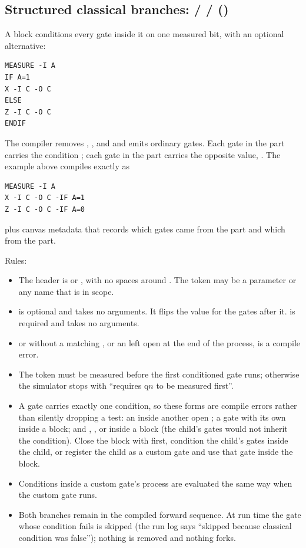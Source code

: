 \subsection{Structured classical branches:  /  /  (\implemented)}
\hypertarget{if-else-blocks}{}

A block conditions every gate inside it on one measured bit, with an optional
alternative:
\begin{lstlisting}
MEASURE -I A
IF A=1
X -I C -O C
ELSE
Z -I C -O C
ENDIF
\end{lstlisting}
The compiler removes , , and  and emits
ordinary gates. Each gate in the  part carries the condition
; each gate in the  part carries the opposite value,
. The example above compiles exactly as
\begin{lstlisting}
MEASURE -I A
X -I C -O C -IF A=1
Z -I C -O C -IF A=0
\end{lstlisting}
plus canvas metadata that records which gates came from the  part
and which from the  part.

Rules:
\begin{itemize}
  \item The header is  or , with no spaces
  around \code{=}. The token may be a parameter or any name that is in scope.
  \item {} is optional and takes no arguments. It flips the value for
  the gates after it.  is required and takes no arguments.
  \item {} or  without a matching , or an
   left open at the end of the process, is a compile error.
  \item The token must be measured before the first conditioned gate runs;
  otherwise the simulator stops with ``requires q$n$ to be measured first''.
  \item A gate carries exactly one condition, so these forms are compile
  errors rather than silently dropping a test: an  inside another
  open ; a gate with its own  inside a block; and
  , , or  inside a block (the child's
  gates would not inherit the condition). Close the block with 
  first, condition the child's gates inside the child, or register the child
  as a custom gate and use that gate inside the block.
  \item Conditions inside a custom gate's process are evaluated the same way
  when the custom gate runs.
  \item Both branches remain in the compiled forward sequence. At run time the
  gate whose condition fails is skipped (the run log says ``skipped because
  classical condition was false''); nothing is removed and nothing forks.
\end{itemize}

